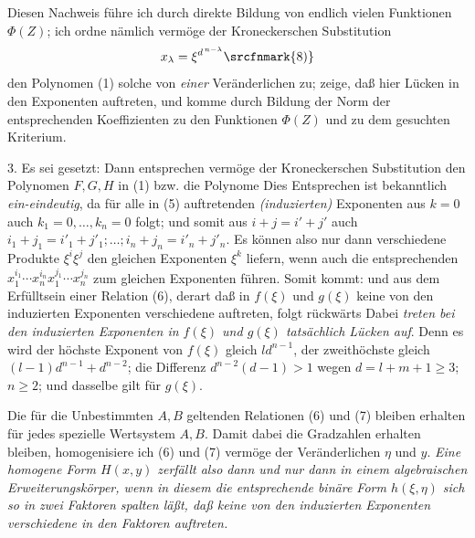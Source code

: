 Diesen Nachweis führe ich durch direkte Bildung von endlich vielen Funktionen $\Phi(Z)$; ich ordne nämlich vermöge der Kroneckerschen Substitution
\[
 x_\lambda=\xi^{d^{\,n-\lambda}}\text{\srcfnmark{8)}}
\]
den Polynomen (1) solche von \emph{einer} Veränderlichen zu; zeige, daß hier Lücken in den Exponenten auftreten, und komme durch Bildung der Norm der entsprechenden Koeffizienten zu den Funktionen $\Phi(Z)$ und zu dem gesuchten Kriterium.

\addtocounter{footnote}{1}

3. Es sei gesetzt:
Dann entsprechen vermöge der Kroneckerschen Substitution den Polynomen $F,G,H$ in (1) bzw. die Polynome
Dies Entsprechen ist bekanntlich \emph{ein-eindeutig}, da für alle in (5) auftretenden \emph{(induzierten)} Exponenten aus $k=0$ auch $k_1=0,\ldots,k_n=0$ folgt; und somit aus $i+j=i'+j'$ auch $i_1+j_1=i'_1+j'_1;\ldots;i_n+j_n=i'_n+j'_n$. Es können also nur dann verschiedene Produkte $\xi^i\xi^j$ den gleichen Exponenten $\xi^k$ liefern, wenn auch die entsprechenden $x_1^{i_1}\cdots x_n^{i_n}x_1^{j_1}\cdots x_n^{j_n}$ zum gleichen Exponenten führen. Somit kommt:
und aus dem Erfülltsein einer Relation (6), derart daß in $f(\xi)$ und $g(\xi)$ keine von den induzierten Exponenten verschiedene auftreten, folgt rückwärts
Dabei \emph{treten bei den induzierten Exponenten in $f(\xi)$ und $g(\xi)$ tatsächlich Lücken auf}. Denn es wird der höchste Exponent von $f(\xi)$ gleich $ld^{n-1}$, der zweithöchste gleich $(l-1)d^{n-1}+d^{n-2}$; die Differenz $d^{n-2}(d-1)>1$ wegen $d=l+m+1\ge3$; $n\ge2$; und dasselbe gilt für $g(\xi)$.

Die für die Unbestimmten $A,B$ geltenden Relationen (6) und (7) bleiben erhalten für jedes spezielle Wertsystem $A,B$. Damit dabei die Gradzahlen erhalten bleiben, homogenisiere ich (6) und (7) vermöge der Veränderlichen $\eta$ und $y$. \emph{Eine homogene Form $H(x,y)$ zerfällt also dann und nur dann in einem algebraischen Erweiterungskörper, wenn in diesem die entsprechende binäre Form $h(\xi,\eta)$ sich so in zwei Faktoren spalten läßt, daß keine von den induzierten Exponenten verschiedene in den Faktoren auftreten.}


